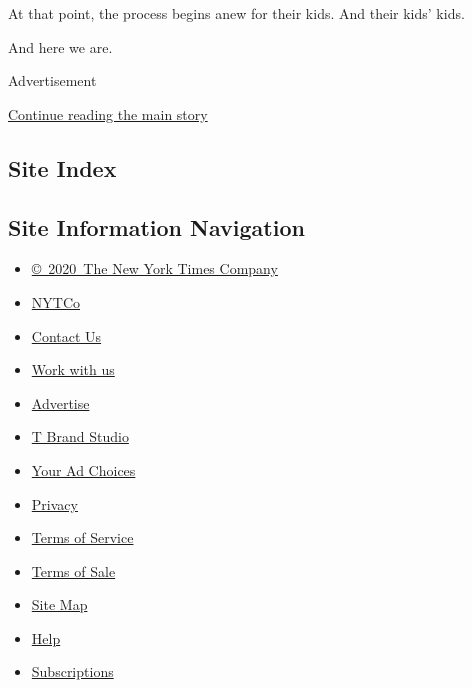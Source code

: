 At that point, the process begins anew for their kids. And their kids'
kids.

And here we are.

Advertisement

\protect\hyperlink{after-bottom}{Continue reading the main story}

\hypertarget{site-index}{%
\subsection{Site Index}\label{site-index}}

\hypertarget{site-information-navigation}{%
\subsection{Site Information
Navigation}\label{site-information-navigation}}

\begin{itemize}
\tightlist
\item
  \href{https://help.nytimes.com/hc/en-us/articles/115014792127-Copyright-notice}{©~2020~The
  New York Times Company}
\end{itemize}

\begin{itemize}
\tightlist
\item
  \href{https://www.nytco.com/}{NYTCo}
\item
  \href{https://help.nytimes.com/hc/en-us/articles/115015385887-Contact-Us}{Contact
  Us}
\item
  \href{https://www.nytco.com/careers/}{Work with us}
\item
  \href{https://nytmediakit.com/}{Advertise}
\item
  \href{http://www.tbrandstudio.com/}{T Brand Studio}
\item
  \href{https://www.nytimes.com/privacy/cookie-policy\#how-do-i-manage-trackers}{Your
  Ad Choices}
\item
  \href{https://www.nytimes.com/privacy}{Privacy}
\item
  \href{https://help.nytimes.com/hc/en-us/articles/115014893428-Terms-of-service}{Terms
  of Service}
\item
  \href{https://help.nytimes.com/hc/en-us/articles/115014893968-Terms-of-sale}{Terms
  of Sale}
\item
  \href{https://spiderbites.nytimes.com}{Site Map}
\item
  \href{https://help.nytimes.com/hc/en-us}{Help}
\item
  \href{https://www.nytimes.com/subscription?campaignId=37WXW}{Subscriptions}
\end{itemize}
